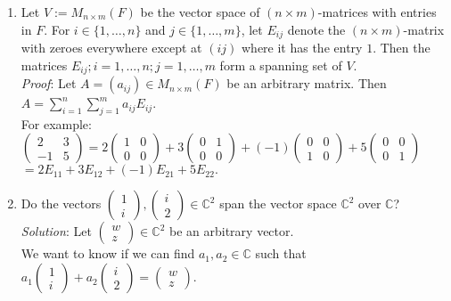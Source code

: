 \documentclass[
  12pt,
  a4paper,
  twoside]{article}
\theoremstyle{plain}
\theoremstyle{definition}
\begin{document}
\begin{enumerate}
\def\labelenumi{(\alph{enumi})}
\item
  Let \(V := M_{n \times m}(F)\) be the vector space of \((n \times m)\)-matrices with entries in \(F\). For \(i \in \{1, \dots, n \}\) and \(j \in \{1, \dots, m\}\), let \(E_{ij}\) denote the \((n \times m)\)-matrix with zeroes everywhere except at \((ij)\) where it has the entry \(1\). Then the matrices \(E_{ij}; i=1, \dots, n ; j=1, \dots, m\) form a spanning set of \(V\).\\
  \emph{Proof}: Let \(A = (a_{ij}) \in M_{n \times m}(F)\) be an arbitrary matrix. Then \(A = \sum_{i=1}^n \sum_{j=1}^m a_{ij} E_{ij}\).\\
  For example: \(\left(\begin{smallmatrix} 2 & 3 \\ -1 & 5 \end{smallmatrix}\right) = 2 \left(\begin{smallmatrix} 1 & 0 \\ 0 & 0 \end{smallmatrix}\right) + 3 \left(\begin{smallmatrix} 0 & 1 \\ 0 & 0 \end{smallmatrix}\right) + (-1) \left(\begin{smallmatrix} 0 & 0 \\ 1 & 0 \end{smallmatrix}\right) + 5 \left(\begin{smallmatrix} 0 & 0 \\ 0 & 1 \end{smallmatrix}\right)\) \(= 2E_{11}+3E_{12}+(-1)E_{21}+5E_{22}.\)
\item
  Do the vectors \(\begin{pmatrix} 1 \\ i \end{pmatrix}, \begin{pmatrix} i \\ 2 \end{pmatrix} \in \mathbb{C}^2\) span the vector space \(\mathbb{C}^2\) over \(\mathbb{C}\)?\\
  \emph{Solution}: Let \(\begin{pmatrix} w \\ z \end{pmatrix} \in \mathbb{C}^2\) be an arbitrary vector.\\
  We want to know if we can find \(a_1, a_2 \in \mathbb{C}\) such that \(a_1 \begin{pmatrix} 1 \\ i \end{pmatrix} + a_2 \begin{pmatrix} i \\ 2 \end{pmatrix} = \begin{pmatrix} w \\ z \end{pmatrix}\).\\

\end{enumerate}
\end{document}
